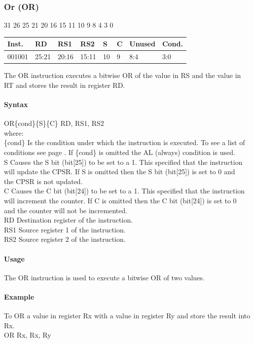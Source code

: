 \documentclass[12pt]{article}
\newcommand{\aTypeInstruction}[6]
{%
    \hspace{1.6cm}31 \hspace{1.15cm}26 \hspace{.04cm}25 \hspace{.8cm}21 \hspace{.04cm}20 \hspace{.8cm}16 \hspace{.04cm}15 \hspace{.8cm}11 \hspace{.04cm}10 \hspace{.275cm}9 \hspace{.275cm}8 \hspace{1.175cm}4 \hspace{.04cm}3 \hspace{1.25cm}0
    \vspace{-.25cm}
    \begin{center}
        \begin{tabular}{ |p{1.8cm}|p{1.5cm}|p{1.5cm}|p{1.5cm}|p{0.3cm}|p{0.3cm}|p{1.5cm}|p{1.5cm}| }
            \hline
            \textbf{Inst.} & \textbf{RD}& \textbf{RS1} & \textbf{RS2} & \textbf{S} & \textbf{C} & Unused & \textbf{Cond.}\\
            \hline
            #1 & 25:21 & 20:16 & 15:11 & 10 & 9 & 8:4 &3:0\\
            \hline
        \end{tabular}
    \end{center}
    
    \noindent
    #2\\
    
    \paragraph{Syntax}
    \begin{flushleft}
    #3\{cond\}\{S\}\{C\} RD, RS1, RS2\\
    \vspace{1em}        %
    where:\\
    \vspace{1em}
    \{cond\}    \hspace{2em} Is the condition under which the instruction is executed. To see a list of\\
                \hspace{5.4em} conditions see page . If \{cond\} is omitted the AL (always) condition is used.\\
    \vspace{1em}    
    S       \hspace{4.5em} Causes the S bit (bit[25]) to be set to a 1. This specified that the instruction\\
            \hspace{5.4em} will update the CPSR. If S is omitted then the S bit (bit[25]) is set to 0 and\\
            \hspace{5.4em} the CPSR is not updated.\\
    \vspace{1em}    
    C       \hspace{4.5em} Causes the C bit (bit[24]) to be set to a 1. This specified that the instruction\\
            \hspace{5.4em} will increment the counter. If C is omitted then the C bit (bit[24]) is set to 0\\
            \hspace{5.4em} and the counter will not be incremented.\\
    \vspace{1em}
    RD  \hspace{3.6em} Destination register of the instruction.\\
    \vspace{1em}
    RS1  \hspace{3.35em} Source register 1 of the instruction.\\
    \vspace{1em}
    RS2  \hspace{3.35em} Source register 2 of the instruction.\\
    \end{flushleft}
    
    \paragraph{Usage}
    \begin{flushleft}
    #4\\
    \end{flushleft}
    \paragraph{Example}
    \begin{flushleft}
    #5\\
    \vspace{1em}
    #6
    \end{flushleft}
    }
\begin{document}
   
   




    \newpage
    \subsubsection{Or (OR)}
    
    \aTypeInstruction
    {001001}
    {The OR instruction executes a bitwise OR of the value in RS and the value in RT and stores the result in register RD.}
    {OR}
    {The OR instruction is used to execute a bitwise OR of two values.}
    {To OR a value in register Rx with a value in register Ry and store the result into Rx.}
    {OR Rx, Rx, Ry}
    
    
\end{document}
